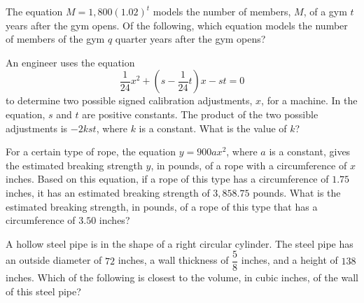 The equation \(M = 1{,}800(1.02)^t\) models the number of members, \(M\), of a gym \(t\) years after the gym opens.
Of the following, which equation models the number of members of the gym \(q\) quarter years after the gym opens?

\vspace{0.75em}


\vspace{2em}
\newpage

\noindent\markforreview
\vspace{1em}

An engineer uses the equation
\[
\frac{1}{24}x^{2} + \left(s - \frac{1}{24}t\right)x - st = 0
\]
to determine two possible signed calibration adjustments, \(x\), for a machine. In the equation, \(s\) and \(t\) are positive constants.
The product of the two possible adjustments is \(-2kst\), where \(k\) is a constant.
What is the value of \(k\)?

\vspace{2em}
\newpage

\noindent\markforreview
\vspace{1em}

For a certain type of rope, the equation \(y = 900ax^{2}\), where \(a\) is a constant, gives the estimated breaking strength \(y\), in pounds, of a rope with a circumference of \(x\) inches.
Based on this equation, if a rope of this type has a circumference of \(1.75\) inches, it has an estimated breaking strength of \(3{,}858.75\) pounds.
What is the estimated breaking strength, in pounds, of a rope of this type that has a circumference of \(3.50\) inches?

\vspace{2em}
\newpage

\noindent\markforreview
\vspace{1em}

A hollow steel pipe is in the shape of a right circular cylinder.
The steel pipe has an outside diameter of \(72\) inches, a wall thickness of \(\dfrac{5}{8}\) inches, and a height of \(138\) inches.
Which of the following is closest to the volume, in cubic inches, of the wall of this steel pipe?

\vspace{0.75em}


